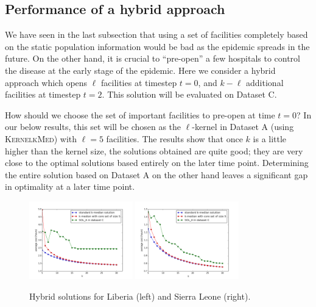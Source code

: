 \subsection*{Performance of a hybrid approach}
We have seen in the last subsection that using a set of facilities completely based on the static population information would be bad as the epidemic spreads in the future. On the other hand, it is crucial to ``pre-open'' a few hospitals to control the disease at the early stage of the epidemic. Here we consider a hybrid approach which opens $\ell$ facilities at timestep $t=0$, and $k-\ell$ additional facilities at timestep $t=2$. This solution will be evaluated on Dataset C.

How should we choose the set of important facilities to pre-open at time $t = 0$? In our below results, this set will be chosen as the $\ell$-kernel in Dataset A (using \textsc{KernelkMed}) with $\ell = 5$ facilities. The results show that once $k$ is a little higher than the kernel size, the solutions obtained are quite good; they are very close to the optimal solutions based entirely on the later time point. Determining the entire solution based on Dataset A on the other hand leaves a significant gap in optimality at a later time point.


\begin{figure}[h]
    \centering
       \includegraphics[width=0.40\textwidth]{new_figs/plotC_hybrid_freq_L.png}
       \includegraphics[width=0.40\textwidth]{new_figs/plotC_hybrid_freq_SL.png}
    \caption{Hybrid solutions for Liberia (left) and Sierra Leone (right).}
\label{fig:hybrid}
\end{figure}


